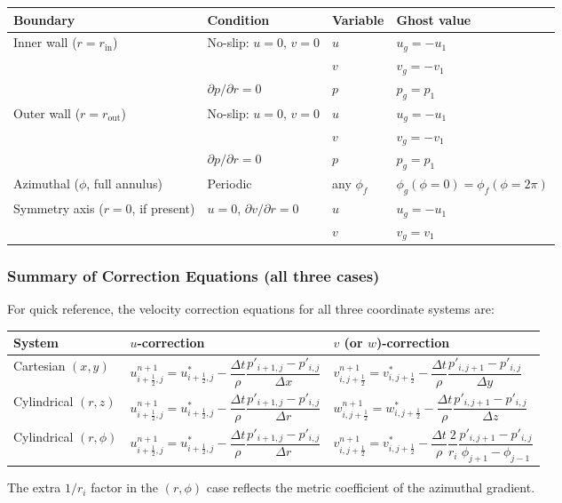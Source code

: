 \begin{center}
\begin{tabular}{llll}
\toprule
Boundary & Condition & Variable & Ghost value \\
\midrule
Inner wall ($r=r_\text{in}$)  & No-slip: $u=0$, $v=0$  & $u$ & $u_g = -u_1$ \\
                               &                        & $v$ & $v_g = -v_1$ \\
                               & $\partial p/\partial r=0$ & $p$ & $p_g = p_1$ \\
\midrule
Outer wall ($r=r_\text{out}$) & No-slip: $u=0$, $v=0$  & $u$ & $u_g = -u_1$ \\
                               &                        & $v$ & $v_g = -v_1$ \\
                               & $\partial p/\partial r=0$ & $p$ & $p_g = p_1$ \\
\midrule
Azimuthal ($\phi$, full annulus) & Periodic & any $\phi_f$ & $\phi_g(\phi=0) = \phi_f(\phi=2\pi)$ \\
\midrule
Symmetry axis ($r=0$, if present) & $u=0$, $\partial v/\partial r=0$ & $u$ & $u_g=-u_1$ \\
                                   &                                   & $v$ & $v_g = v_1$ \\
\bottomrule
\end{tabular}
\end{center}

\subsubsection{Summary of Correction Equations (all three cases)}

For quick reference, the velocity correction equations for all three coordinate systems are:

\begin{center}
\renewcommand{\arraystretch}{2.0}
\begin{tabular}{lll}
\toprule
System & $u$-correction & $v$ (or $w$)-correction \\
\midrule
Cartesian $(x,y)$
  & $u^{n+1}_{i+\frac{1}{2},j} = u^*_{i+\frac{1}{2},j} - \dfrac{\Delta t}{\rho}\dfrac{p'_{i+1,j}-p'_{i,j}}{\Delta x}$
  & $v^{n+1}_{i,j+\frac{1}{2}} = v^*_{i,j+\frac{1}{2}} - \dfrac{\Delta t}{\rho}\dfrac{p'_{i,j+1}-p'_{i,j}}{\Delta y}$ \\[6pt]
Cylindrical $(r,z)$
  & $u^{n+1}_{i+\frac{1}{2},j} = u^*_{i+\frac{1}{2},j} - \dfrac{\Delta t}{\rho}\dfrac{p'_{i+1,j}-p'_{i,j}}{\Delta r}$
  & $w^{n+1}_{i,j+\frac{1}{2}} = w^*_{i,j+\frac{1}{2}} - \dfrac{\Delta t}{\rho}\dfrac{p'_{i,j+1}-p'_{i,j}}{\Delta z}$ \\[6pt]
Cylindrical $(r,\phi)$
  & $u^{n+1}_{i+\frac{1}{2},j} = u^*_{i+\frac{1}{2},j} - \dfrac{\Delta t}{\rho}\dfrac{p'_{i+1,j}-p'_{i,j}}{\Delta r}$
  & $v^{n+1}_{i,j+\frac{1}{2}} = v^*_{i,j+\frac{1}{2}} - \dfrac{\Delta t}{\rho}\dfrac{2}{r_i}\dfrac{p'_{i,j+1}-p'_{i,j}}{\phi_{j+1}-\phi_{j-1}}$ \\
\bottomrule
\end{tabular}
\end{center}

The extra $1/r_i$ factor in the $(r,\phi)$ case reflects the metric coefficient of the azimuthal gradient.
